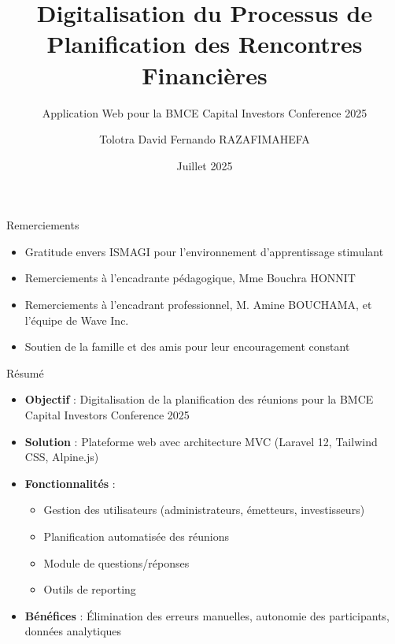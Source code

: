 \documentclass{beamer}
\title{Digitalisation du Processus de Planification des Rencontres Financières}
\subtitle{Application Web pour la BMCE Capital Investors Conference 2025}
\author{Tolotra David Fernando RAZAFIMAHEFA}
\institute{Institut Supérieur de Management (ISMAGI)}
\date{Juillet 2025}
\begin{document}
\begin{frame}
\maketitle
\end{frame}

\begin{frame}{Remerciements}
\begin{itemize}
    \item Gratitude envers ISMAGI pour l'environnement d'apprentissage stimulant
    \item Remerciements à l'encadrante pédagogique, Mme Bouchra HONNIT
    \item Remerciements à l'encadrant professionnel, M. Amine BOUCHAMA, et l'équipe de Wave Inc.
    \item Soutien de la famille et des amis pour leur encouragement constant
\end{itemize}
\end{frame}

\begin{frame}{Résumé}
\begin{itemize}
    \item \textbf{Objectif} : Digitalisation de la planification des réunions pour la BMCE Capital Investors Conference 2025
    \item \textbf{Solution} : Plateforme web avec architecture MVC (Laravel 12, Tailwind CSS, Alpine.js)
    \item \textbf{Fonctionnalités} :
    \begin{itemize}
        \item Gestion des utilisateurs (administrateurs, émetteurs, investisseurs)
        \item Planification automatisée des réunions
        \item Module de questions/réponses
        \item Outils de reporting
    \end{itemize}
    \item \textbf{Bénéfices} : Élimination des erreurs manuelles, autonomie des participants, données analytiques
\end{itemize}
\end{frame}
\end{document}
